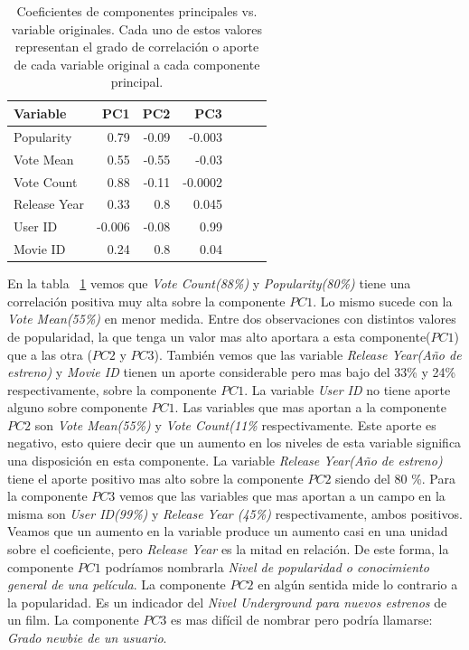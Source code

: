 \documentclass[11pt,a4paper,twoside]{thesis}
\begin{document}
\begin{table}[h!]
	\centering
	\begin{tabular}{lrrrrrr}
		\toprule Variable   & PC1    & PC2   & PC3     \\
		\midrule Popularity & 0.79   & -0.09 & -0.003  \\
		Vote Mean           & 0.55   & -0.55 & -0.03   \\
		Vote Count          & 0.88   & -0.11 & -0.0002 \\
		Release Year        & 0.33   & 0.8   & 0.045   \\
		User ID             & -0.006 & -0.08 & 0.99    \\
		Movie ID            & 0.24   & 0.8   & 0.04    \\
		\bottomrule
	\end{tabular}

	\caption{Coeficientes de componentes principales vs. variable originales. Cada uno de estos valores representan el grado de correlación o aporte de cada variable original a cada componente principal.}

	\label{fig:loadingsTable}
\end{table}

En la tabla ~\ref{fig:loadingsTable} vemos que \textit{Vote Count(88\%)} y
\textit{Popularity(80\%)} tiene una correlación positiva muy alta sobre la
componente $PC1$. Lo mismo sucede con la \textit{Vote Mean(55\%)} en menor
medida. Entre dos observaciones con distintos valores de popularidad, la que
tenga un valor mas alto aportara a esta componente($PC1$) que a las otra ($PC2$
y $PC3$). También vemos que las variable \textit{Release Year(Año de estreno)}
y \textit{Movie ID} tienen un aporte considerable pero mas bajo del 33\% y 24\%
respectivamente, sobre la componente $PC1$. La variable \textit{User ID} no
tiene aporte alguno sobre componente $PC1$. Las variables que mas aportan a la
componente $PC2$ son \textit{Vote Mean(55\%)} y \textit{Vote Count(11\%}
respectivamente. Este aporte es negativo, esto quiere decir que un aumento en
los niveles de esta variable significa una disposición en esta componente. La
variable \textit{Release Year(Año de estreno)} tiene el aporte positivo mas
alto sobre la componente $PC2$ siendo del 80 \%. Para la componente $PC3$ vemos
que las variables que mas aportan a un campo en la misma son \textit{User
	ID(99\%)} y \textit{Release Year (45\%)} respectivamente, ambos positivos.
Veamos que un aumento en la variable  produce un aumento casi en
una unidad sobre el coeficiente, pero \textit{Release Year} es la mitad en
relación. De este forma, la componente $PC1$ podríamos nombrarla \textit{Nivel
	de popularidad o conocimiento general de una película}. La componente $PC2$ en
algún sentida mide lo contrario a la popularidad. Es un indicador del
\textit{Nivel Underground para nuevos estrenos} de un film. La componente $PC3$
es mas difícil de nombrar pero podría llamarse: \textit{Grado newbie de un
	usuario}.
\end{document}
